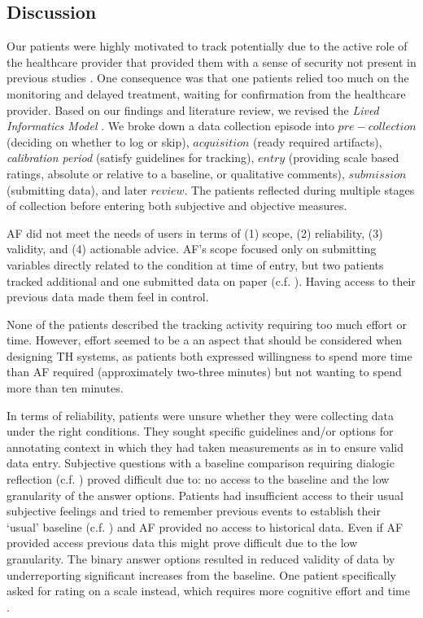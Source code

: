 \subsection{Discussion}
Our patients were highly motivated to track potentially due to the active role of the healthcare provider that provided them with a sense of security not present in previous studies \cite{Li2010, Ancker2015, Chung2015}. One consequence was that one patients relied too much on the monitoring and delayed treatment, waiting for confirmation from the healthcare provider.
 Based on our findings and literature review, we revised the \textit{Lived Informatics Model} \cite{Epstein2015}. We broke down a data collection episode into $pre-collection$ (deciding on whether to log or skip), $acquisition$ (ready required artifacts), \textit{calibration period} (satisfy guidelines for tracking), $entry$ (providing scale based ratings, absolute or relative to a baseline, or qualitative comments), $submission$ (submitting data), and later $review$. The patients reflected during multiple stages of collection before entering both subjective and objective measures. 

AF did not meet the needs of users in terms of (1) scope, (2) reliability, (3) validity, and (4) actionable advice. AF’s scope focused only on submitting variables directly related to the condition at time of entry, but two patients tracked additional and one submitted data on paper (c.f. \cite{Patel2012, Chung2016}). Having access to their previous data made them feel in control. 

None of the patients described the tracking activity requiring too much effort or time. However, effort seemed to be a an aspect that should be considered when designing TH systems, as patients both expressed willingness to spend more time than AF required (approximately two-three minutes) but not wanting to spend more than ten minutes.

In terms of reliability, patients were unsure whether they were collecting data under the right conditions. They sought specific guidelines and/or options for annotating context in which they had taken measurements as in \cite{Verdezoto2015} to ensure valid data entry. Subjective questions with a baseline comparison requiring dialogic reflection (c.f. \cite{Fleck}) proved difficult due to: no access to the baseline and the low granularity of the answer options. Patients had insufficient access to their usual subjective feelings  and tried to remember previous events to establish their ‘usual’ baseline (c.f. \cite{piloting}) and AF provided no access to historical data. Even if AF provided access previous data this might prove difficult due to the low granularity. The binary answer options resulted in reduced validity of data by underreporting significant increases from the baseline. One patient specifically asked for rating on a scale instead, which requires more cognitive effort and time \cite{Oh2015}. 

